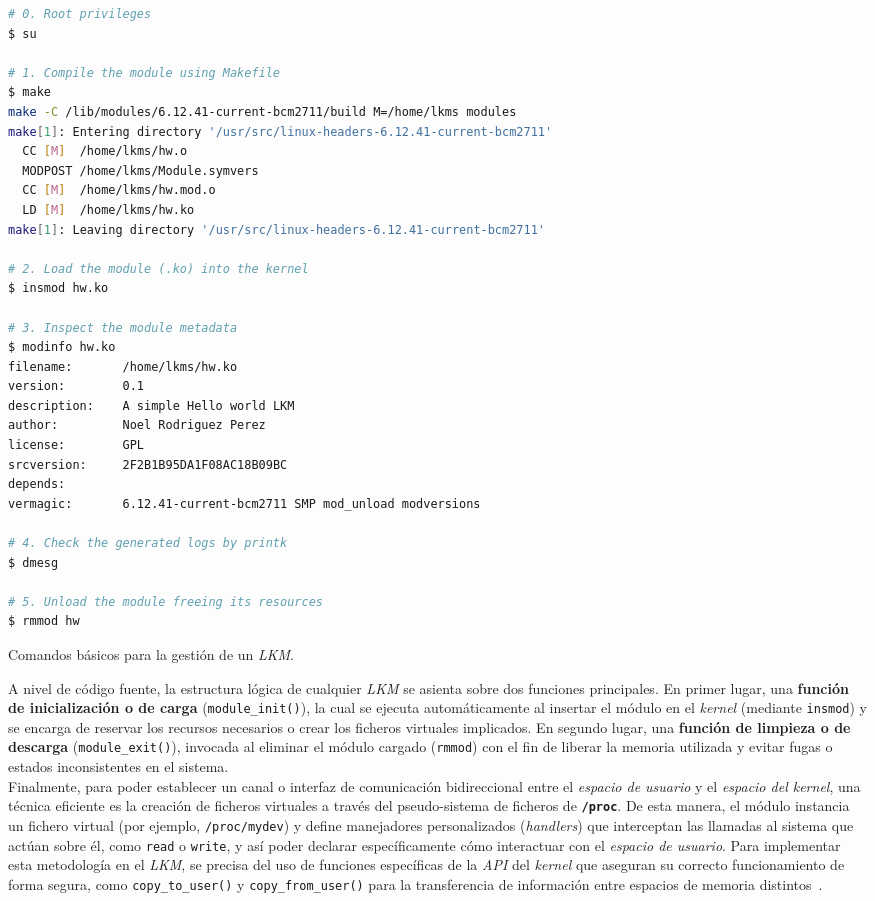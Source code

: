 \begin{code}[h!]
\begin{lstlisting}[language=bash]
# 0. Root privileges
$ su

# 1. Compile the module using Makefile
$ make
make -C /lib/modules/6.12.41-current-bcm2711/build M=/home/lkms modules
make[1]: Entering directory '/usr/src/linux-headers-6.12.41-current-bcm2711'
  CC [M]  /home/lkms/hw.o
  MODPOST /home/lkms/Module.symvers
  CC [M]  /home/lkms/hw.mod.o
  LD [M]  /home/lkms/hw.ko
make[1]: Leaving directory '/usr/src/linux-headers-6.12.41-current-bcm2711'

# 2. Load the module (.ko) into the kernel
$ insmod hw.ko

# 3. Inspect the module metadata
$ modinfo hw.ko
filename:       /home/lkms/hw.ko
version:        0.1
description:    A simple Hello world LKM
author:         Noel Rodriguez Perez
license:        GPL
srcversion:     2F2B1B95DA1F08AC18B09BC
depends:        
vermagic:       6.12.41-current-bcm2711 SMP mod_unload modversions

# 4. Check the generated logs by printk
$ dmesg

# 5. Unload the module freeing its resources
$ rmmod hw
\end{lstlisting}
\caption[Comandos básicos de gestión de LKMs.]{Comandos básicos para la gestión de un \textit{LKM}.}
\label{cod:lkm_commands}
\end{code}

A nivel de código fuente, la estructura lógica de cualquier \textit{LKM} se asienta sobre dos funciones principales.
En primer lugar, una \textbf{función de inicialización o de carga} (\texttt{module\_init()}), la cual se ejecuta automáticamente al insertar el módulo en el \textit{kernel} (mediante \texttt{insmod}) y se encarga de reservar los recursos necesarios o crear los ficheros virtuales implicados.
En segundo lugar, una \textbf{función de limpieza o de descarga} (\texttt{module\_exit()}), invocada al eliminar el módulo cargado (\texttt{rmmod}) con el fin de liberar la memoria utilizada y evitar fugas o estados inconsistentes en el sistema.\\

Finalmente, para poder establecer un canal o interfaz de comunicación bidireccional entre el \textit{espacio de usuario} y el \textit{espacio del kernel}, una técnica eficiente es la creación de ficheros virtuales a través del pseudo-sistema de ficheros de \textbf{\texttt{/proc}}.
De esta manera, el módulo instancia un fichero virtual (por ejemplo, \texttt{/proc/mydev}) y define manejadores personalizados (\textit{handlers}) que interceptan las llamadas al sistema que actúan sobre él, como \texttt{read} o \texttt{write}, y así poder declarar específicamente cómo interactuar con el \textit{espacio de usuario}.
Para implementar esta metodología en el \textit{LKM}, se precisa del uso de funciones específicas de la \textit{API} del \textit{kernel} que aseguran su correcto funcionamiento de forma segura, como \texttt{copy\_to\_user()} y \texttt{copy\_from\_user()} para la transferencia de información entre espacios de memoria distintos~\cite{medium_proc}.\\

